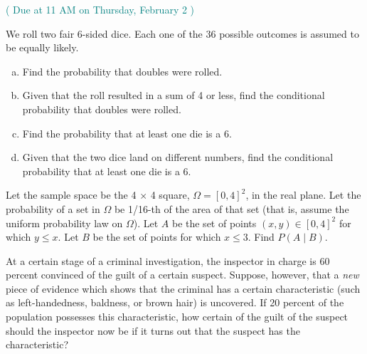 \documentclass[12pt]{article}
\newenvironment{question}[2][Question]{\begin{trivlist}
\item[\hskip \labelsep {\bfseries #1}\hskip \labelsep {\bfseries #2.}]}{\end{trivlist}}
\begin{document}
\subsection*{}
\centering\textcolor{teal}{\\ (  Due at 11 AM on Thursday, February 2 )}
\vspace{5mm}


 \begin{question}{1} We roll two fair 6-sided dice. Each one of the 36 possible outcomes is
assumed to be equally likely.
\begin{enumerate}[(a)]
 \item  Find the probability that doubles were rolled.
\item  Given that the roll resulted in a sum of 4 or less, find the conditional probability
that doubles were rolled.
 \item Find the probability that at least one die is a 6.
 \item Given that the two dice land on different numbers, find the conditional probability
that at least one die is a 6.
 \end{enumerate}

\end{question} 


\pagebreak
 \begin{question}{2} Let the sample space be the 4 $\times$ 4 square, $\Omega  = [0, 4]^2$, in the real plane. Let the probability 
 of a set in $\Omega$ be 1/16-th of the area of that set (that is, assume the uniform probability law on $\Omega$). Let $A$ be 
 the set of points $(x, y) \in [0, 4]^2$ for which $y \leq x$. Let $B$ be the set of points for which $x \leq 3$. Find $P(A \mid B)$.
\end{question} 


 

\pagebreak
 \begin{question}{3} At a certain stage of a criminal investigation, the inspector in charge is 60
  percent convinced
of the guilt of a certain suspect. Suppose, however, that a \emph{new} piece of evidence
which shows that the criminal has a certain characteristic (such as left-handedness,
baldness, or brown hair) is uncovered. If 20 percent of the population possesses this
characteristic, how certain of the guilt of the suspect should the inspector now be if it
turns out that the suspect has the characteristic?
\end{question} 
\end{document}
